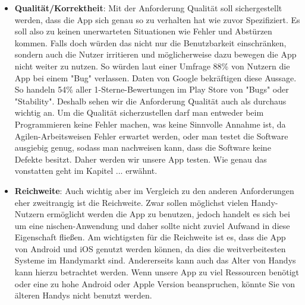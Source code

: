 \begin{itemize}
		
	\item \textbf{Qualität/Korrektheit}: Mit der Anforderung Qualität soll sichergestellt werden, dass die App sich genau so zu verhalten hat wie zuvor Spezifiziert. Es soll also zu keinen unerwarteten Situationen wie Fehler und Abstürzen kommen.\newline%
	Falls doch würden das nicht nur die Benutzbarkeit einschränken, sondern auch die Nutzer irritieren und möglicherweise dazu bewegen die App nicht weiter zu nutzen. So würden laut einer Umfrage 88\% von Nutzern die App bei einem "Bug" verlassen\cite{nfA_bugsAbandon}. Daten von Google bekräftigen diese Aussage. So handeln 54\% aller 1-Sterne-Bewertungen im Play Store von "Bugs" oder "Stability"\cite{nfA_bugsReview}. Deshalb sehen wir die Anforderung Qualität auch als durchaus wichtig an.\newline%
	Um die Qualität sicherzustellen darf man entweder beim Programmieren keine Fehler machen, was keine Sinnvolle Annahme ist, da Agilen-Arbeitsweisen Fehler erwartet werden, oder man testet die Software ausgiebig genug, sodass man nachweisen kann, dass die Software keine Defekte besitzt. Daher werden wir unsere App testen. Wie genau das vonstatten geht im Kapitel ... erwähnt.
	
	\item \textbf{Reichweite}: Auch wichtig aber im Vergleich zu den anderen Anforderungen eher zweitrangig ist die Reichweite. Zwar sollen möglichst vielen Handy-Nutzern ermöglicht werden die App zu benutzen, jedoch handelt es sich bei um eine nischen-Anwendung und daher sollte nicht zuviel Aufwand in diese Eigenschaft fließen.\newline%
	Am wichtigsten für die Reichweite ist es, dass die App von Android und iOS genutzt werden können, da dies die weitverbeitesten Systeme im Handymarkt sind\cite{}. Andererseits kann auch das Alter von Handys kann hierzu betrachtet werden. Wenn unsere App zu viel Ressourcen benötigt oder eine zu hohe Android oder Apple Version beanspruchen, könnte Sie von älteren Handys nicht benutzt werden.
	

\end{itemize}
